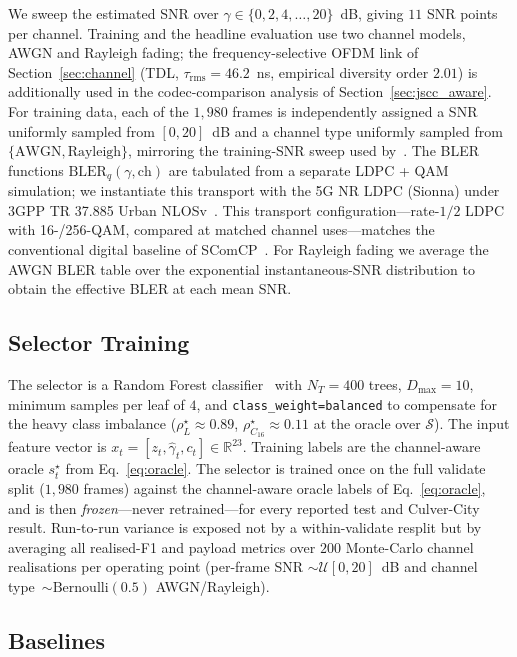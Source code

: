 \documentclass[journal]{IEEEtran}
\begin{document}
We sweep the estimated SNR over $\gamma \in \{0,2,4,\ldots,20\}$~dB, giving $11$ SNR points per channel. Training and the headline evaluation use two channel models, AWGN and Rayleigh fading; the frequency-selective OFDM link of Section~\ref{sec:channel} (TDL, $\tau_{\mathrm{rms}}=46.2$~ns, empirical diversity order $2.01$) is additionally used in the codec-comparison analysis of Section~\ref{sec:jscc_aware}. For training data, each of the $1{,}980$ frames is independently assigned a SNR uniformly sampled from $[0,20]$~dB and a channel type uniformly sampled from $\{\text{AWGN},\text{Rayleigh}\}$, mirroring the training-SNR sweep used by~\cite{sheng2024importance,gan2026scomcp}. The BLER functions $\mathrm{BLER}_q(\gamma,\text{ch})$ are tabulated from a separate LDPC + QAM simulation; we instantiate this transport with the 5G NR LDPC (Sionna) under 3GPP TR 37.885 Urban NLOSv~\cite{3gpp37885}. This transport configuration---rate-$1/2$ LDPC with 16-/256-QAM, compared at matched channel uses---matches the conventional digital baseline of SComCP~\cite{gan2026scomcp}. For Rayleigh fading we average the AWGN BLER table over the exponential instantaneous-SNR distribution to obtain the effective BLER at each mean SNR.

\subsection{Selector Training}

The selector is a Random Forest classifier~\cite{breiman2001random} with $N_T=400$ trees, $D_{\max}=10$, minimum samples per leaf of $4$, and \texttt{class\_weight=balanced} to compensate for the heavy class imbalance ($\rho_L^\star \approx 0.89$, $\rho_{C_{16}}^\star \approx 0.11$ at the oracle over $\mathcal{S}$). The input feature vector is $x_t = [z_t,\hat\gamma_t,c_t] \in \mathbb{R}^{23}$. Training labels are the channel-aware oracle $s_t^\star$ from Eq.~\eqref{eq:oracle}. The selector is trained once on the full validate split ($1{,}980$ frames) against the channel-aware oracle labels of Eq.~\eqref{eq:oracle}, and is then \emph{frozen}---never retrained---for every reported test and Culver-City result. Run-to-run variance is exposed not by a within-validate resplit but by averaging all realised-F1 and payload metrics over $200$ Monte-Carlo channel realisations per operating point (per-frame SNR $\sim\mathcal{U}[0,20]$~dB and channel type~$\sim\mathrm{Bernoulli}(0.5)$ AWGN/Rayleigh).

\subsection{Baselines}
\end{document}
